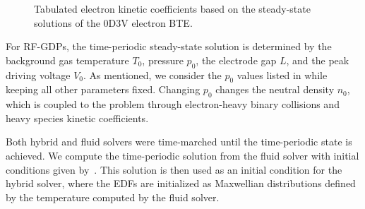\begin{figure}[!tbhp]
	\centering
	\caption{Tabulated electron kinetic coefficients based on the steady-state solutions of the 0D3V electron BTE. \label{fig:bte_0d_kinetics}}
\end{figure}

For RF-GDPs, the time-periodic steady-state solution is determined by the background gas temperature $T_0$, pressure $p_0$, the electrode gap $L$, and the peak driving voltage $V_0$. As mentioned, we consider the $p_0$ values listed in  while keeping all other parameters fixed. Changing $p_0$ changes the neutral density $n_0$, which is coupled to the problem through electron-heavy binary collisions and heavy species kinetic coefficients. 

Both hybrid and fluid solvers were time-marched until the time-periodic state is achieved. We compute the time-periodic solution from the fluid solver with initial conditions given by~\cite{lymberopoulos1993fluid}. This solution is then used as an initial condition for the hybrid solver, where the EDFs are initialized as Maxwellian distributions defined by the temperature computed by the fluid solver. %


